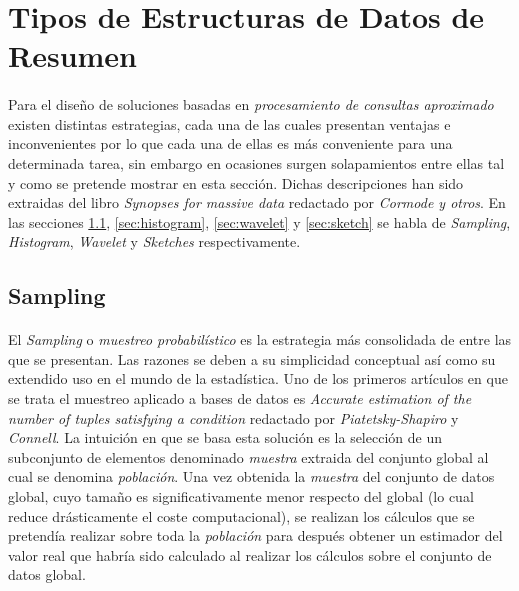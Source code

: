 \documentclass{subfiles}
\begin{document}
    \section{Tipos de Estructuras de Datos de Resumen}
    \label{sec:summaries_types}

      \paragraph{}
      Para el diseño de soluciones basadas en \emph{procesamiento de consultas aproximado} existen distintas estrategias, cada una de las cuales presentan ventajas e inconvenientes por lo que cada una de ellas es más conveniente para una determinada tarea, sin embargo en ocasiones surgen solapamientos entre ellas tal y como se pretende mostrar en esta sección. Dichas descripciones han sido extraidas del libro \emph{Synopses for massive data} \cite{cormode2012synopses} redactado por \emph{Cormode y otros}. En las secciones \ref{sec:sampling}, \ref{sec:histogram}, \ref{sec:wavelet} y \ref{sec:sketch} se habla de \emph{Sampling}, \emph{Histogram}, \emph{Wavelet} y \emph{Sketches} respectivamente.

      \subsection{Sampling}
      \label{sec:sampling}

        \paragraph{}
        El \emph{Sampling} o \emph{muestreo probabilístico} es la estrategia más consolidada de entre las que se presentan. Las razones se deben a su simplicidad conceptual así como su extendido uso en el mundo de la estadística. Uno de los primeros artículos en que se trata el muestreo aplicado a bases de datos es \emph{Accurate estimation of the number of tuples satisfying a condition} \cite{piatetsky1984accurate} redactado por \emph{Piatetsky-Shapiro} y \emph{Connell}. La intuición en que se basa esta solución es la selección de un subconjunto de elementos denominado \emph{muestra} extraida del conjunto global al cual se denomina \emph{población}. Una vez obtenida la \emph{muestra} del conjunto de datos global, cuyo tamaño es significativamente menor respecto del global (lo cual reduce drásticamente el coste computacional), se realizan los cálculos que se pretendía realizar sobre toda la \emph{población} para después obtener un estimador del valor real que habría sido calculado al realizar los cálculos sobre el conjunto de datos global.
\end{document}
